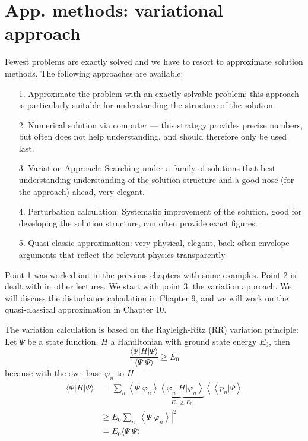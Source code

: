 \chapter{App. methods: variational approach}
Fewest problems are exactly solved and we have to resort to approximate solution methods. The following approaches are available:
\begin{enumerate}
    \item[1.] Approximate the problem with an exactly solvable problem; this approach is particularly suitable for understanding the structure of the solution.
    \item[2.] Numerical solution via computer — this strategy provides precise numbers, but often does not help understanding, and should therefore only be used last.
    \item[3.] Variation Approach: Searching under a family of solutions that best understanding understanding of the solution structure and a good nose (for the approach) ahead, very elegant. 
    \item[4.] Perturbation calculation: Systematic improvement of the solution, good for developing the solution structure, can often provide exact figures. 
    \item[5.] Quasi-classic approximation: very physical, elegant, back-often-envelope arguments that reflect the relevant physics transparently 
\end{enumerate}
Point {\color{red}1} was worked out in the previous chapters with some examples. Point {\color{red}2} is dealt with in other lectures. We start with point {\color{red}3}, the variation approach. We will discuss the disturbance calculation in Chapter 9, and we will work on the quasi-classical approximation in Chapter 10.\par
The variation calculation is based on the Rayleigh-Ritz (RR) variation principle: Let $\Psi$ be a state function, $H$ a Hamiltonian with ground state energy $E_0$, then
\begin{equation}
    \frac{\langle\Psi|H| \Psi\rangle}{\langle\Psi | \Psi\rangle} \geq E_{0}
    \end{equation}
because with the own base $\varphi_n$ to $H$
\begin{equation}
\begin{aligned}\langle\Psi|H| \Psi\rangle &=\sum_{n}\left\langle\Psi | \varphi_{n}\right\rangle \underbrace{\left\langle\varphi_{n}|H| \varphi_{n}\right\rangle}_{E_{n} \geq E_{0}}\left\langle\left\langle p_{n} | \Psi\right\rangle\right.\\ & \geq E_{0} \sum_{n}\left|\left\langle\Psi | \varphi_{n}\right\rangle\right|^{2} \\ &=E_{0}\langle\Psi | \Psi\rangle \end{aligned}
\end{equation}
